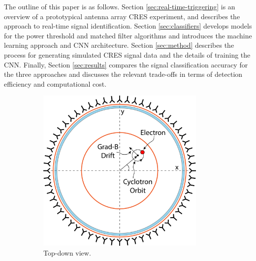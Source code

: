 The outline of this paper is as follows. Section \ref{sec:real-time-triggering} is an overview of a prototypical antenna array CRES experiment, and describes the approach to real-time signal identification. Section \ref{sec:classifiers} develops models for the power threshold and matched filter algorithms and introduces the machine learning approach and CNN architecture. Section \ref{sec:method} describes the process for generating simulated CRES signal data and the details of training the CNN. Finally, Section \ref{sec:results} compares the signal classification accuracy for the three approaches and discusses the relevant trade-offs in terms of detection efficiency and computational cost.

\begin{figure}[h]
    \centering
    \begin{subfigure}{0.48\textwidth}
        \centering
        \includegraphics[width=0.9\textwidth]{figs/Chapter-4/230328_deepfilter_paper_apparatus_concept_top_v2.png}
        \caption{Top-down view.}
        \label{fig:apparatus_concept_top}
    \end{subfigure}
    \begin{subfigure}{0.48\textwidth}
        \centering

\end{subfigure}
\end{figure}
